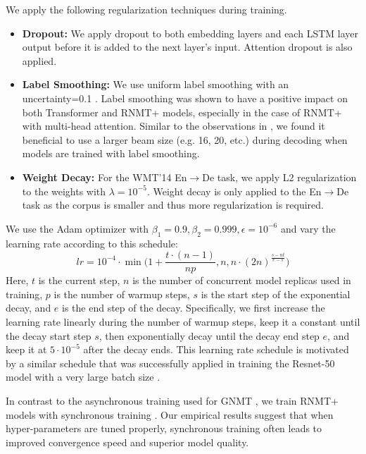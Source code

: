 \documentclass[11pt,a4paper]{article}
\begin{document}
We apply the following regularization techniques during training.
\begin{itemize}
\item \textbf{Dropout:} We apply dropout to both embedding layers and each LSTM
 layer output before it is added to the next layer's input. Attention dropout is also applied.

\item \textbf{Label Smoothing:} We use uniform label smoothing with an
  uncertainty=0.1 \cite{DBLP:journals/corr/SzegedyVISW15}. Label smoothing was shown to have a positive impact on both
Transformer and RNMT+ models, especially in the case of RNMT+ with
multi-head attention. Similar to the observations in \cite{DBLP:journals/corr/ChorowskiJ16}, we found it beneficial to use a larger beam size
(e.g. 16, 20, etc.) during decoding when models are trained with label
smoothing.

\item \textbf{Weight Decay:} For the WMT'14 En$\rightarrow$De task, we apply L2
regularization to the weights with $\lambda = 10^{-5}$. Weight decay is only
applied to the En$\rightarrow$De task as the corpus is smaller and thus more
regularization is required.
\end{itemize}


We use the Adam optimizer \cite{DBLP:journals/corr/KingmaB14} with $\beta_1 = 0.9, \beta_2 = 0.999,
\epsilon = 10^{-6}$ and vary the learning rate according to this schedule:
\begin{equation}
lr = 10^{-4} \cdot \min\Big(1 + \frac{t \cdot (n-1)}{np}, n, n \cdot (2n)^{\frac{s- nt}{e - s}}\Big)
\label{eq:rnmt_lr}
\end{equation}
Here, $t$ is the current step, $n$ is the number of concurrent model replicas used in training, $p$
is the number of warmup steps, $s$ is the start step of the exponential decay, and
$e$ is the end step of the decay. Specifically, we first increase the learning
rate linearly during the  number of warmup steps, keep it a constant until the
decay start step $s$, then exponentially decay until the decay end step $e$,
and keep it at $5 \cdot 10^{-5}$ after the decay ends. This learning rate
schedule is motivated by a similar schedule that was successfully
applied in training the Resnet-50 model with a very large batch size
\cite{DBLP:journals/corr/GoyalDGNWKTJH17}.

In contrast to the asynchronous training used for GNMT
\cite{downpoursgd}, we train RNMT+ models with synchronous training
\cite{DBLP:journals/corr/ChenMBJ16}. Our empirical results suggest that when
hyper-parameters are tuned properly, synchronous training often leads
to improved convergence speed and superior model quality.
\end{document}
